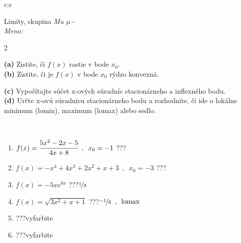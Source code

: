 \documentclass[10pt]{report}
\begin{document}
\begin{tabular}{c:c}
\begin{minipage}[c][104.5mm][t]{0.5\linewidth}
\begin{center}
\vspace{7mm}
{\huge Limity, skupina \textit{Mu $\mu$} -}\\[5mm]
\textit{Meno:}\phantom{xxxxxxxxxxxxxxxxxxxxxxxxxxxxxxxxxxxxxxxxxxxxxxxxxxxxxxxxxxxxxxxxx}\\[5mm]
\begin{minipage}{0.95\linewidth}
\begin{center}
{\small \begin{multicols}{2} \raggedright
\textbf{(a)} Zistite, či \(f(x)\) rastie v bode \(x_0\). \\[1mm]
\textbf{(b)} Zistite, či je \(f(x)\) v bode \(x_0\) rýdzo konvexná. \par \columnbreak
\textbf{(c)} Vypočítajte súčet x-ových súradníc stacionárneho a inflexného bodu. \\[1mm]
\textbf{(d)} Určte x-ovú súradnicu stacionárneho bodu a rozhodnite, či ide o lokálne minimum (lomin), maximum (lomax) alebo sedlo. \\[1mm]
\end{multicols}
}
\end{center}
\end{minipage}
\\[4mm]
\begin{minipage}{0.79\linewidth}
\begin{center}
\begin{varwidth}{\linewidth}
\begin{enumerate}
\normalsize
\item $f(x)=\cfrac{5x^2-2x-5}{4x+8}\enspace , \enspace x_0=-1$\quad \dotfill\; ???\;\dotfill \quad {}
\item $f(x)=-x^4+4x^3+2x^2+x+3\enspace , \enspace x_0=-3$\quad \dotfill\; ???\;\dotfill \quad {}
\item $f(x)=-5xe^{8x}$\quad \dotfill\; ???\;\dotfill \quad $\nicefrac{1}{8}$
\item $f(x)=\sqrt{3x^2+x+1}$\quad \dotfill\; ???\;\dotfill \quad $\nicefrac{-1}{6}\enspace , \enspace\text{lomax}$
\item \quad \dotfill\; ???\;\dotfill \quad vyfarbite
\item \quad \dotfill\; ???\;\dotfill \quad vyfarbite
\end{enumerate}
\end{varwidth}
\end{center}

\end{minipage}
\end{center}
\end{minipage}
\end{tabular}
\end{document}

